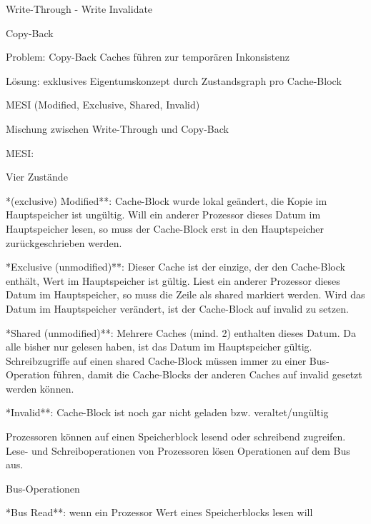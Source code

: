 \documentclass[10pt,landscape]{article}
\begin{document}
\begin{multicols}{3}
  Write-Through - Write Invalidate
  
  Copy-Back
  \begin{itemize*}
    \item Problem: Copy-Back Caches führen zur temporären Inkonsistenz
    \item Lösung: exklusives Eigentumskonzept durch Zustandsgraph pro Cache-Block
    \item MESI (Modified, Exclusive, Shared, Invalid)
    \item Mischung zwischen Write-Through und Copy-Back
  \end{itemize*}
  
  MESI: 
  \begin{itemize*}
    \item Vier Zustände
    \begin{itemize*}
      \item **(exclusive) Modified**: Cache-Block wurde lokal geändert, die Kopie im Hauptspeicher ist ungültig. Will ein anderer Prozessor dieses Datum im Hauptspeicher lesen, so muss der Cache-Block erst in den Hauptspeicher zurückgeschrieben werden.
      \item **Exclusive (unmodified)**: Dieser Cache ist der einzige, der den Cache-Block enthält, Wert im Hauptspeicher ist gültig. Liest ein anderer Prozessor dieses Datum im Hauptspeicher, so muss die Zeile als shared markiert werden. Wird das Datum im Hauptspeicher verändert, ist der Cache-Block auf invalid zu setzen.
      \item **Shared (unmodified)**: Mehrere Caches (mind. 2) enthalten dieses Datum. Da alle bisher nur gelesen haben, ist das Datum im Hauptspeicher gültig. Schreibzugriffe auf einen shared Cache-Block müssen immer zu einer Bus-Operation führen, damit die Cache-Blocks der anderen Caches auf invalid gesetzt werden können.
      \item **Invalid**: Cache-Block ist noch gar nicht geladen bzw. veraltet/ungültig
      \item Prozessoren können auf einen Speicherblock lesend oder schreibend zugreifen. Lese- und Schreiboperationen von Prozessoren lösen Operationen auf dem Bus aus.
    \end{itemize*}
    \item Bus-Operationen
    \begin{itemize*}
      \item **Bus Read**: wenn ein Prozessor Wert eines Speicherblocks lesen will

\end{itemize*}
\end{itemize*}
\end{multicols}
\end{document}

